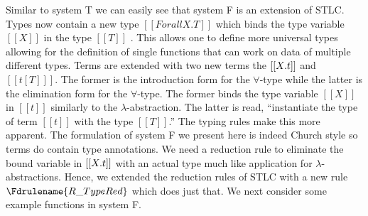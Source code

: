 Similar to system T we can easily see that system F is an extension of
STLC.  Types now contain a new type $[[Forall X.T]]$ which binds the
type variable $[[X]]$ in the type $[[T]]$
.  This allows one to define more
universal types allowing for the definition of single functions that
can work on data of multiple different types.  Terms are extended with
two new terms the $[[\\X.t]]$ and $[[t [T] ]]$.  The former is the
introduction form for the $\forall$-type while the latter is the
elimination form for the $\forall$-type. The former binds the type
variable $[[X]]$ in $[[t]]$ similarly to the
$\lambda$-abstraction. The latter is read, ``instantiate the type of
term $[[t]]$ with the type $[[T]]$.''  The typing rules make this more
apparent.  The formulation of system F we present here is indeed
Church style so terms do contain type annotations.  We need a
reduction rule to eliminate the bound variable in $[[\\X.t]]$ with an
actual type much like application for $\lambda$-abstractions.  Hence,
we extended the reduction rules of STLC with a new rule
$\Fdrulename{R\_TypeRed}$ which does just that.  We next consider some
example functions in system F.

